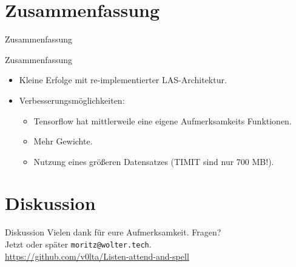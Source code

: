 \documentclass[10pt]{beamer}
\begin{document}
\section{Zusammenfassung}
\begin{frame}{Zusammenfassung}

\begin{table}
\caption{Ausgewählte Parameter und Fehler einiger interessanter Experimente.}
\end{table}

\end{frame}

\begin{frame}{Zusammenfassung}
\begin{itemize}
	\item Kleine Erfolge mit re-implementierter LAS-Architektur.
	\item Verbesserungsmöglichkeiten:
		\begin{itemize}
			\item Tensorflow hat mittlerweile eine eigene Aufmerksamkeits
				  Funktionen.
			\item Mehr Gewichte.
			\item Nutzung eines größeren Datensatzes (TIMIT sind nur 700 MB!).
		\end{itemize}
\end{itemize}
\end{frame}


\section{Diskussion}
\begin{frame}{Diskussion}
	Vielen dank für eure Aufmerksamkeit. Fragen? \\
	Jetzt oder später \texttt{moritz@wolter.tech}. \\
	\url{https://github.com/v0lta/Listen-attend-and-spell}
\end{frame}
\end{document}
